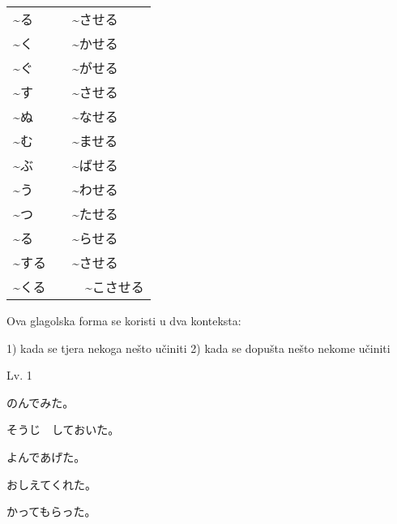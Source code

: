 
\author{Tomislav Mamić}

		
	
	\begin{table}[h]
		\centering
		\begin{tabular}{l l}\toprule[2pt]
			\midrule
			\textasciitilde る & \textasciitilde させる \\
			\textasciitilde く & \textasciitilde かせる \\
			\textasciitilde ぐ & \textasciitilde がせる \\
			\textasciitilde す & \textasciitilde させる \\
			\textasciitilde ぬ & \textasciitilde なせる \\
			\textasciitilde む & \textasciitilde ませる \\
			\textasciitilde ぶ & \textasciitilde ばせる \\
			\textasciitilde う & \textasciitilde わせる \\
			\textasciitilde つ & \textasciitilde たせる \\
			\textasciitilde る & \textasciitilde らせる \\
			\textasciitilde する　& \textasciitilde させる \\
			\textasciitilde くる　&　\textasciitilde こさせる 
			\bottomrule[2pt]
		\end{tabular}
	\end{table}
	
	
	
	Ova glagolska forma se koristi u dva konteksta:

	1) kada se tjera nekoga nešto učiniti
	2) kada se dopušta nešto nekome učiniti
	
	\begin{reibun}
	\end{reibun}
	
	
	\begin{mondai}{Lv. 1}
		\item のんでみた。
		\item そうじ　しておいた。
		\item よんであげた。
		\item おしえてくれた。
		\item かってもらった。
	\end{mondai}

